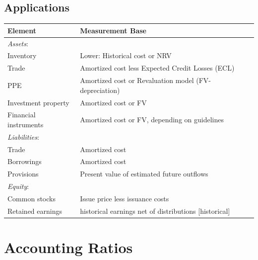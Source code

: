 \documentclass[12pt]{article}
\begin{document}
\subsection{Applications}
\begin{tcolorbox}
\begin{tabularx}{\textwidth}{|l|X|}
	\hline
	\textbf{Element} & \textbf{Measurement Base} \\
	\hline
	\textit{Assets}: & \\
	Inventory & Lower: Historical cost or NRV \\
	Trade & Amortized cost less Expected Credit Losses (ECL)\\
	PPE &  Amortized cost or Revaluation model (FV- depreciation) \\
	Investment property & Amortized cost or FV \\
	Financial instruments & Amortized cost or FV, depending on guidelines \\
	\hline
	\textit{Liabilities}: & \\
	Trade & Amortized cost \\	
	Borrowings & Amortized cost \\
	Provisions & Present value of estimated future outflows \\
	\hline
	\textit{Equity}: & \\
	Common stocks & Issue price less issuance costs \\
	Retained earnings & historical earnings net of distributions [historical]\\
	\hline
\end{tabularx}
\end{tcolorbox}	


\section{Accounting Ratios}
\end{document}
